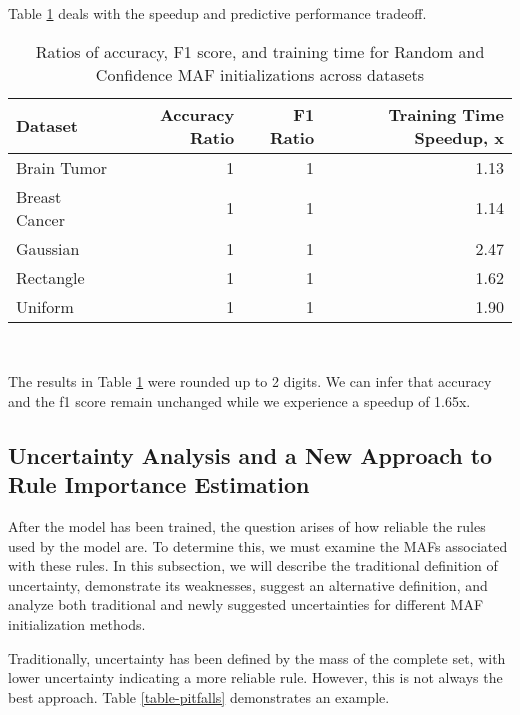 \documentclass[10pt,a4paper,oneside]{article}
\begin{document}
\newpage
Table \ref{table-ratios} deals with the speedup and predictive performance tradeoff. \\

\begin{table}[htbp]
    \centering
    \caption{Ratios of accuracy, F1 score, and training time for Random and Confidence MAF initializations across datasets}
    \label{table-ratios}
    \begin{tabular}{l|r|r|r}
    \toprule
    Dataset & Accuracy Ratio & F1 Ratio & Training Time Speedup, x \\
    \midrule
Brain Tumor & 1 & 1 & 1.13 \\
Breast Cancer & 1 & 1 & 1.14 \\
Gaussian & 1 & 1 & 2.47 \\
Rectangle & 1 & 1 & 1.62 \\
Uniform & 1 & 1 & 1.90 \\
    \bottomrule
    \end{tabular} \\
\end{table}

The results in Table \ref{table-ratios} were rounded up to 2 digits. We can infer that accuracy and the f1 score remain unchanged while we experience a speedup of 1.65x.


\subsection{Uncertainty Analysis and a New Approach to Rule Importance Estimation}\label{sec:uncertainty-analysis}
After the model has been trained, the question arises of how reliable the rules used by the model are. To determine this, we must examine the MAFs associated with these rules. In this subsection, we will describe the traditional definition of uncertainty, demonstrate its weaknesses, suggest an alternative definition, and analyze both traditional and newly suggested uncertainties for different MAF initialization methods.

Traditionally, uncertainty has been defined by the mass of the complete set, with lower uncertainty indicating a more reliable rule. However, this is not always the best approach. Table \ref{table-pitfalls} demonstrates an example. 
\end{document}
